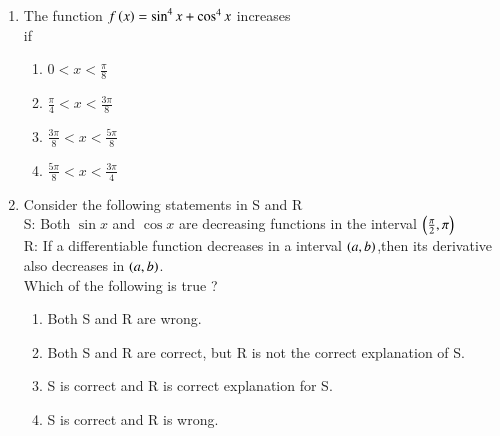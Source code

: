 \documentclass[journal]{IEEEtran}
\begin{document}
\begin{enumerate}[start=9]
\item The function $f\left(x\right)= \sin^4{x}+\cos^4{x}$ increases \\
if \hfill {}
\begin{multicols}{2}
\begin{enumerate}
    \item $0<x<\frac{\pi}{8}$\\
    \item $\frac{\pi}{4}<x<\frac{3\pi}{8}$\\
    \item $\frac{3\pi}{8} <x<\frac{5\pi}{8}$\\
    \item $\frac{5\pi}{8}<x<\frac{3\pi}{4}$\\
\end{enumerate}
\end{multicols}
\item Consider the following statements in S and R \hfill {}\\
S: Both $\sin{x}$ and $\cos{x}$ are decreasing functions in the interval $\left(\frac{\pi}{2},\pi\right)$\\
R: If a differentiable function decreases in a interval $\left(a,b\right)$,then its derivative also decreases in $\left(a,b\right)$.\\
Which of the following is true ?
\begin{enumerate}
    \item Both S and R are wrong.
    \item Both S and R are correct, but R is not the correct explanation of S.
    \item S is correct and R is correct explanation for S.
    \item S is correct and R is wrong.\\
\end{enumerate}


\end{enumerate}
\end{document}
